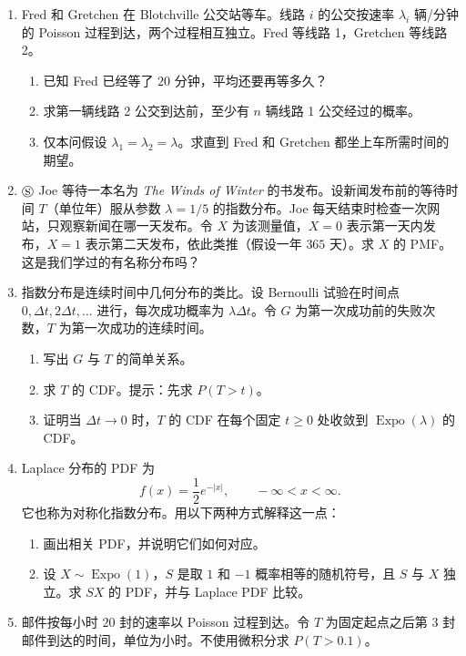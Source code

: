 \documentclass[UTF8, 12pt, fontset=fandol, oneside]{ctexart}
\begin{document}
\begin{enumerate}
  \item Fred 和 Gretchen 在 Blotchville 公交站等车。线路 $i$ 的公交按速率 $\lambda_i$ 辆/分钟的 Poisson 过程到达，两个过程相互独立。Fred 等线路 1，Gretchen 等线路 2。
  \begin{enumerate}
    \item 已知 Fred 已经等了 $20$ 分钟，平均还要再等多久？
    \item 求第一辆线路 2 公交到达前，至少有 $n$ 辆线路 1 公交经过的概率。
    \item 仅本问假设 $\lambda_1=\lambda_2=\lambda$。求直到 Fred 和 Gretchen 都坐上车所需时间的期望。
  \end{enumerate}

  \item $\circledS$ Joe 等待一本名为 \textit{The Winds of Winter} 的书发布。设新闻发布前的等待时间 $T$（单位年）服从参数 $\lambda=1/5$ 的指数分布。Joe 每天结束时检查一次网站，只观察新闻在哪一天发布。令 $X$ 为该测量值，$X=0$ 表示第一天内发布，$X=1$ 表示第二天发布，依此类推（假设一年 $365$ 天）。求 $X$ 的 PMF。这是我们学过的有名称分布吗？

  \item 指数分布是连续时间中几何分布的类比。设 Bernoulli 试验在时间点 $0,\Delta t,2\Delta t,\ldots$ 进行，每次成功概率为 $\lambda\Delta t$。令 $G$ 为第一次成功前的失败次数，$T$ 为第一次成功的连续时间。
  \begin{enumerate}
    \item 写出 $G$ 与 $T$ 的简单关系。
    \item 求 $T$ 的 CDF。提示：先求 $P(T>t)$。
    \item 证明当 $\Delta t\to0$ 时，$T$ 的 CDF 在每个固定 $t\ge0$ 处收敛到 $\operatorname{Expo}(\lambda)$ 的 CDF。
  \end{enumerate}

  \item Laplace 分布的 PDF 为
  \[
    f(x)=\frac12 e^{-|x|},\qquad -\infty<x<\infty.
  \]
  它也称为对称化指数分布。用以下两种方式解释这一点：
  \begin{enumerate}
    \item 画出相关 PDF，并说明它们如何对应。
    \item 设 $X\sim\operatorname{Expo}(1)$，$S$ 是取 $1$ 和 $-1$ 概率相等的随机符号，且 $S$ 与 $X$ 独立。求 $SX$ 的 PDF，并与 Laplace PDF 比较。
  \end{enumerate}

  \item 邮件按每小时 $20$ 封的速率以 Poisson 过程到达。令 $T$ 为固定起点之后第 $3$ 封邮件到达的时间，单位为小时。不使用微积分求 $P(T>0.1)$。


\end{enumerate}
\end{document}
